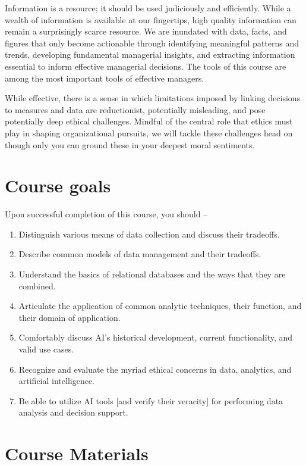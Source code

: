 \documentclass[11pt,]{article}
\providecommand{\tightlist}{%
  \setlength{\itemsep}{0pt}\setlength{\parskip}{0pt}}
\begin{document}
Information is a resource; it should be used judiciously and
efficiently. While a wealth of information is available at our
fingertips, high quality information can remain a surprisingly scarce
resource. We are inundated with data, facts, and figures that only
become actionable through identifying meaningful patterns and trends,
developing fundamental managerial insights, and extracting information
essential to inform effective managerial decisions. The tools of this
course are among the most important tools of effective managers.

While effective, there is a sense in which limitations imposed by
linking decisions to measures and data are reductionist, potentially
misleading, and pose potentially deep ethical challenges. Mindful of the
central role that ethics must play in shaping organizational pursuits,
we will tackle these challenges head on though only you can ground these
in your deepest moral sentiments.

\section{Course goals}\label{course-goals}

Upon successful completion of this course, you should --

\begin{enumerate}
\def\labelenumi{\arabic{enumi}.}
\tightlist
\item
  Distinguish various means of data collection and discuss their
  tradeoffs.
\item
  Describe common models of data management and their tradeoffs.
\item
  Understand the basics of relational databases and the ways that they
  are combined.
\item
  Articulate the application of common analytic techniques, their
  function, and their domain of application.
\item
  Comfortably discuss AI's historical development, current
  functionality, and valid use cases.
\item
  Recognize and evaluate the myriad ethical concerns in data, analytics,
  and artificial intelligence.
\item
  Be able to utilize AI tools {[}and verify their veracity{]} for
  performing data analysis and decision support.
\end{enumerate}

\section{Course Materials}\label{course-materials}
\end{document}
